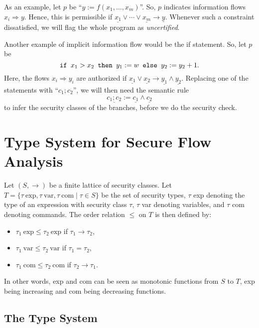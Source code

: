 \documentclass{llncs}
\newcommand{\lit}[1]{\mathrm{#1}}
\begin{document}
As an example, let $p$ be ``$y := f(x_1, \dots, x_m)$''. So, $p$ indicates information flows $x_i \Rightarrow y$. Hence, this is permissible if $\underline{x_1} \vee \cdots \vee \underline{x_m} \rightarrow \underline{y}$. Whenever such a constraint dissatisfied, we will flag the whole program as \textit{uncertified}.

Another example of implicit information flow would be the if statement. So, let $p$ be 
\[
\mbox{\texttt{if }} x_1 > x_2 \mbox{\texttt{ then }} y_1 := w
\mbox{\texttt{ else }} y_2 := y_2 + 1.
\]
Here, the flows $x_i \Rightarrow y_i$ are authorized if $\underline{x_1} \vee \underline{x_2} \rightarrow \underline{y_1} \wedge \underline{y_2}$.
Replacing one of the statements with ``$c_1; c_2$'', we will then need the semantic rule
\[
\underline{c_1; c_2} := \underline{c_1} \wedge \underline{c_2}
\]
to infer the security classes of the branches, before we do the security check.

\section{Type System for Secure Flow Analysis}

Let $(S, \rightarrow)$ be a finite lattice of security classes. Let $T = \{\tau\ \lit{exp}, \tau\ \lit{var}, \tau\ \lit{com} \mid \tau \in S\}$ be the set of security types, $\tau$ exp denoting the type of an expression with security class $\tau$, $\tau$ var denoting variables, and $\tau$ com denoting commands. The order relation $\leq$ on $T$ is then defined by:
\begin{itemize}
    \item $\tau_1\ \lit{exp} \leq \tau_2\ \lit{exp}$ if $\tau_1 \rightarrow \tau_2$,
    \item $\tau_1\ \lit{var} \leq \tau_2\ \lit{var}$ if $\tau_1 = \tau_2$,
    \item $\tau_1\ \lit{com} \leq \tau_2\ \lit{com}$ if $\tau_2 \rightarrow \tau_1$.
\end{itemize}
In other words, exp and com can be seen as monotonic functions from $S$ to $T$, exp being increasing and com being decreasing functions. 


\subsection{The Type System}
\end{document}
